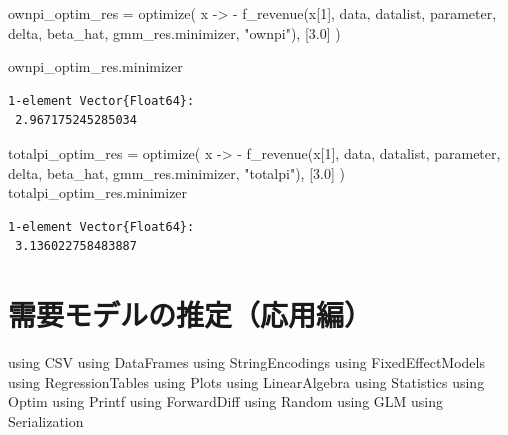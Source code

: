 \documentclass[
  letterpaper,
  DIV=11,
  numbers=noendperiod]{scrreprt}
\newenvironment{Shaded}{\begin{snugshade}}{\end{snugshade}}
\newcommand{\BuiltInTok}[1]{\textcolor[rgb]{0.00,0.23,0.31}{#1}}
\newcommand{\FloatTok}[1]{\textcolor[rgb]{0.68,0.00,0.00}{#1}}
\newcommand{\FunctionTok}[1]{\textcolor[rgb]{0.28,0.35,0.67}{#1}}
\newcommand{\ImportTok}[1]{\textcolor[rgb]{0.00,0.46,0.62}{#1}}
\newcommand{\NormalTok}[1]{\textcolor[rgb]{0.00,0.23,0.31}{#1}}
\newcommand{\OperatorTok}[1]{\textcolor[rgb]{0.37,0.37,0.37}{#1}}
\newcommand{\StringTok}[1]{\textcolor[rgb]{0.13,0.47,0.30}{#1}}
\begin{document}
\begin{Shaded}
\begin{Highlighting}[]
\NormalTok{ownpi\_optim\_res }\OperatorTok{=} \FunctionTok{optimize}\NormalTok{(}
\NormalTok{    x }\OperatorTok{{-}\textgreater{}} \OperatorTok{{-}} \FunctionTok{f\_revenue}\NormalTok{(x[}\FloatTok{1}\NormalTok{], data, datalist, parameter, delta, beta\_hat, gmm\_res.minimizer, }\StringTok{"ownpi"}\NormalTok{),}
\NormalTok{    [}\FloatTok{3.0}\NormalTok{]}
\NormalTok{)}

\NormalTok{ownpi\_optim\_res.minimizer}
\end{Highlighting}
\end{Shaded}

\begin{verbatim}
1-element Vector{Float64}:
 2.967175245285034
\end{verbatim}

\begin{Shaded}
\begin{Highlighting}[]
\NormalTok{totalpi\_optim\_res }\OperatorTok{=} \FunctionTok{optimize}\NormalTok{(}
\NormalTok{    x }\OperatorTok{{-}\textgreater{}} \OperatorTok{{-}} \FunctionTok{f\_revenue}\NormalTok{(x[}\FloatTok{1}\NormalTok{], data, datalist, parameter, delta, beta\_hat, gmm\_res.minimizer, }\StringTok{"totalpi"}\NormalTok{),}
\NormalTok{    [}\FloatTok{3.0}\NormalTok{]}
\NormalTok{)}
\NormalTok{totalpi\_optim\_res.minimizer}
\end{Highlighting}
\end{Shaded}

\begin{verbatim}
1-element Vector{Float64}:
 3.136022758483887
\end{verbatim}


\hypertarget{ux9700ux8981ux30e2ux30c7ux30ebux306eux63a8ux5b9aux5fdcux7528ux7de8}{%
\chapter{需要モデルの推定（応用編）}\label{ux9700ux8981ux30e2ux30c7ux30ebux306eux63a8ux5b9aux5fdcux7528ux7de8}}

\begin{Shaded}
\begin{Highlighting}[]
\ImportTok{using} \BuiltInTok{CSV}
\ImportTok{using} \BuiltInTok{DataFrames}
\ImportTok{using} \BuiltInTok{StringEncodings}
\ImportTok{using} \BuiltInTok{FixedEffectModels}
\ImportTok{using} \BuiltInTok{RegressionTables}
\ImportTok{using} \BuiltInTok{Plots}
\ImportTok{using} \BuiltInTok{LinearAlgebra}
\ImportTok{using} \BuiltInTok{Statistics}
\ImportTok{using} \BuiltInTok{Optim}
\ImportTok{using} \BuiltInTok{Printf}
\ImportTok{using} \BuiltInTok{ForwardDiff}
\ImportTok{using} \BuiltInTok{Random}
\ImportTok{using} \BuiltInTok{GLM}
\ImportTok{using} \BuiltInTok{Serialization}
\end{Highlighting}
\end{Shaded}
\end{document}
